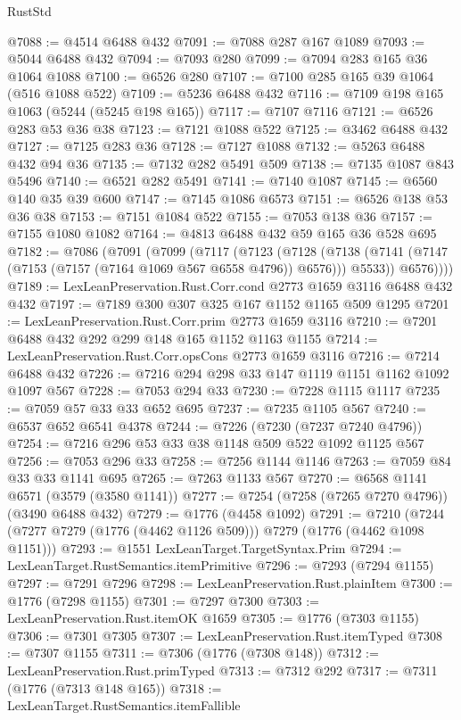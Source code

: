 \begin{lexlean}{RustStd}
\begin{coremodule}
@7088 := @4514 @6488 @432
@7091 := @7088 @287 @167 @1089
@7093 := @5044 @6488 @432
@7094 := @7093 @280
@7099 := @7094 @283 @165 @36 @1064 @1088
@7100 := @6526 @280
@7107 := @7100 @285 @165 @39 @1064 (@516 @1088 @522)
@7109 := @5236 @6488 @432
@7116 := @7109 @198 @165 @1063 (@5244 (@5245 @198 @165))
@7117 := @7107 @7116
@7121 := @6526 @283 @53 @36 @38
@7123 := @7121 @1088 @522
@7125 := @3462 @6488 @432
@7127 := @7125 @283 @36
@7128 := @7127 @1088
@7132 := @5263 @6488 @432 @94 @36
@7135 := @7132 @282 @5491 @509
@7138 := @7135 @1087 @843 @5496
@7140 := @6521 @282 @5491
@7141 := @7140 @1087
@7145 := @6560 @140 @35 @39 @600
@7147 := @7145 @1086 @6573
@7151 := @6526 @138 @53 @36 @38
@7153 := @7151 @1084 @522
@7155 := @7053 @138 @36
@7157 := @7155 @1080 @1082
@7164 := @4813 @6488 @432 @59 @165 @36 @528 @695
@7182 := @7086
    (@7091
      (@7099
        (@7117
          (@7123
            (@7128
              (@7138 (@7141 (@7147 (@7153 (@7157 (@7164 @1069 @567 @6558 @4796)) @6576))) @5533))
            @6576))))
@7189 := LexLeanPreservation.Rust.Corr.cond @2773 @1659 @3116 @6488 @432 @432
@7197 := @7189 @300 @307 @325 @167 @1152 @1165 @509 @1295
@7201 := LexLeanPreservation.Rust.Corr.prim @2773 @1659 @3116
@7210 := @7201 @6488 @432 @292 @299 @148 @165 @1152 @1163 @1155
@7214 := LexLeanPreservation.Rust.Corr.opsCons @2773 @1659 @3116
@7216 := @7214 @6488 @432
@7226 := @7216 @294 @298 @33 @147 @1119 @1151 @1162 @1092 @1097 @567
@7228 := @7053 @294 @33
@7230 := @7228 @1115 @1117
@7235 := @7059 @57 @33 @33 @652 @695
@7237 := @7235 @1105 @567
@7240 := @6537 @652 @6541 @4378
@7244 := @7226 (@7230 (@7237 @7240 @4796))
@7254 := @7216 @296 @53 @33 @38 @1148 @509 @522 @1092 @1125 @567
@7256 := @7053 @296 @33
@7258 := @7256 @1144 @1146
@7263 := @7059 @84 @33 @33 @1141 @695
@7265 := @7263 @1133 @567
@7270 := @6568 @1141 @6571 (@3579 (@3580 @1141))
@7277 := @7254 (@7258 (@7265 @7270 @4796)) (@3490 @6488 @432)
@7279 := @1776 (@4458 @1092)
@7291 := @7210 (@7244 (@7277 @7279 (@1776 (@4462 @1126 @509))) @7279 (@1776 (@4462 @1098 @1151)))
@7293 := @1551 LexLeanTarget.TargetSyntax.Prim
@7294 := LexLeanTarget.RustSemantics.itemPrimitive
@7296 := @7293 (@7294 @1155)
@7297 := @7291 @7296
@7298 := LexLeanPreservation.Rust.plainItem
@7300 := @1776 (@7298 @1155)
@7301 := @7297 @7300
@7303 := LexLeanPreservation.Rust.itemOK @1659
@7305 := @1776 (@7303 @1155)
@7306 := @7301 @7305
@7307 := LexLeanPreservation.Rust.itemTyped
@7308 := @7307 @1155
@7311 := @7306 (@1776 (@7308 @148))
@7312 := LexLeanPreservation.Rust.primTyped
@7313 := @7312 @292
@7317 := @7311 (@1776 (@7313 @148 @165))
@7318 := LexLeanTarget.RustSemantics.itemFallible

\end{coremodule}
\end{lexlean}
